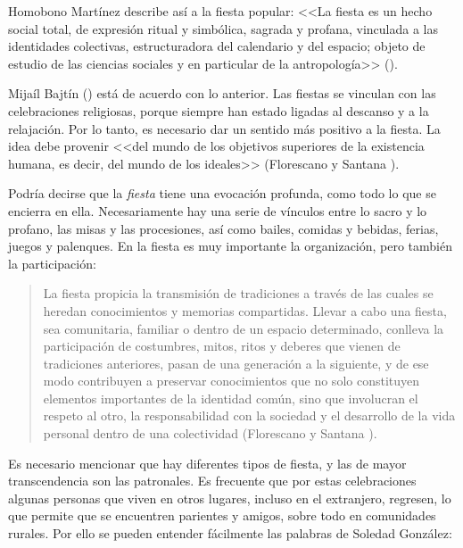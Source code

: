 \documentclass[14pt,letterpaper,twoside]{extbook} %
\begin{document}
Homobono Martínez describe así a la fiesta popular: <<La fiesta es un hecho social total, de expresión ritual y simbólica, sagrada y profana, vinculada a las identidades colectivas, estructuradora del calendario y del espacio; objeto de estudio de las ciencias sociales y en particular de la antropología>> ().

Mijaíl Bajtín () está de acuerdo con lo anterior. Las fiestas se vinculan con las celebraciones religiosas, porque siempre han estado ligadas al descanso y a la relajación. Por lo tanto, es necesario dar un sentido más positivo a la fiesta. La idea debe provenir <<del mundo de los objetivos superiores de la existencia humana, es decir, del mundo de los ideales>> (Florescano y Santana ).

Podría decirse que la \textit{fiesta} tiene una evocación profunda, como todo lo que se encierra en ella. Necesariamente hay una serie de vínculos entre lo sacro y lo profano, las misas y las procesiones, así como bailes, comidas y bebidas, ferias, juegos y palenques. En la fiesta es muy importante la organización, pero también la participación:

\begin{quotation}
\noindent La fiesta propicia la transmisión de tradiciones a través de las cuales se heredan conocimientos y memorias compartidas. Llevar a cabo una fiesta, sea comunitaria, familiar o dentro de un espacio determinado, conlleva la participación de costumbres, mitos, ritos y deberes que vienen de tradiciones anteriores, pasan de una generación a la siguiente, y de ese modo contribuyen a preservar conocimientos que no solo constituyen elementos importantes de la identidad común, sino que involucran el respeto al otro, la responsabilidad con la sociedad y el desarrollo de la vida personal dentro de una colectividad (Florescano y Santana ).
\end{quotation}

\noindent Es necesario mencionar que hay diferentes tipos de fiesta, y las de mayor transcendencia son las patronales. Es frecuente que por estas celebraciones algunas personas que viven en otros lugares, incluso en el extranjero, regresen, lo que permite que se encuentren parientes y amigos, sobre todo en comunidades rurales. Por ello se pueden entender fácilmente las palabras de Soledad González:
\end{document}
